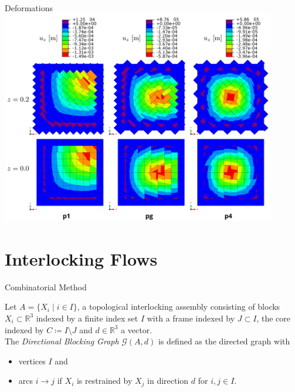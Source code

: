 \documentclass{beamer}
\numberwithin{equation}{aufgabe}
\newcommand\R{\mathbb R}
\begin{document}
\begin{frame}{Deformations}
    \includegraphics[width=0.9\textwidth]{images/u3.png}
\end{frame}

\section{Interlocking Flows}
\begin{frame}{Combinatorial Method}
    \begin{definition}
        Let $A=\{ X_i \mid i\in I\}$, a topological interlocking assembly consisting of blocks $X_i\subset \R^3$ indexed by a finite index set $I$ with a frame indexed by $J\subset I$, the core indexed by $C \coloneqq I \setminus J$ and $d\in \R^3$ a vector.\\ \pause
        The \emph{Directional Blocking Graph} $\mathcal{G}(A,d)$ is defined as the directed graph with \pause
        \begin{itemize}
           \item vertices $I$ and \pause
           \item arcs $i\to j$ if $X_i$ is restrained by $X_j$ in direction $d$ for $i,j\in I$.
        \end{itemize}
    \end{definition}
\end{frame}
\end{document}
